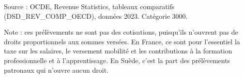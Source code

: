Source : OCDE, Revenue Statistics, tableaux comparatifs (DSD\_REV\_COMP\_OECD), données 2023. Catégorie 3000.\par Note : ces prélèvements ne sont pas des cotisations, puisqu'ils n'ouvrent pas de droits proportionnels aux sommes versées. En France, ce sont pour l'essentiel la taxe sur les salaires, le versement mobilité et les contributions à la formation professionnelle et à l'apprentissage. En Suède, c'est la part des prélèvements patronaux qui n'ouvre aucun droit.
